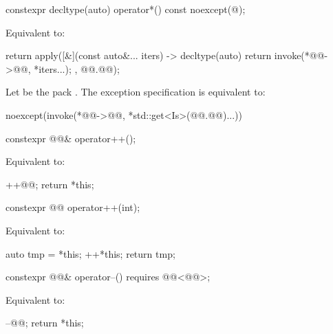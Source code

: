 \begin{itemdecl}
constexpr decltype(auto) operator*() const noexcept(@\seebelow@);
\end{itemdecl}

\begin{itemdescr}
\pnum
\effects
Equivalent to:
\begin{codeblock}
return apply([&](const auto&... iters) -> decltype(auto) {
  return invoke(*@@->@@, *iters...);
}, @@.@@);
\end{codeblock}

\pnum
\remarks
Let  be the pack .
The exception specification is equivalent to:
\begin{codeblock}
noexcept(invoke(*@@->@@, *std::get<Is>(@@.@@)...))
\end{codeblock}
\end{itemdescr}

\begin{itemdecl}
constexpr @@& operator++();
\end{itemdecl}

\begin{itemdescr}
\pnum
\effects
Equivalent to:
\begin{codeblock}
++@@;
return *this;
\end{codeblock}
\end{itemdescr}

\begin{itemdecl}
constexpr @@ operator++(int);
\end{itemdecl}

\begin{itemdescr}
\pnum
\effects
Equivalent to:
\begin{codeblock}
auto tmp = *this;
++*this;
return tmp;
\end{codeblock}
\end{itemdescr}

\begin{itemdecl}
constexpr @@& operator--() requires @@<@@>;
\end{itemdecl}

\begin{itemdescr}
\pnum
\effects
Equivalent to:
\begin{codeblock}
--@@;
return *this;
\end{codeblock}
\end{itemdescr}


